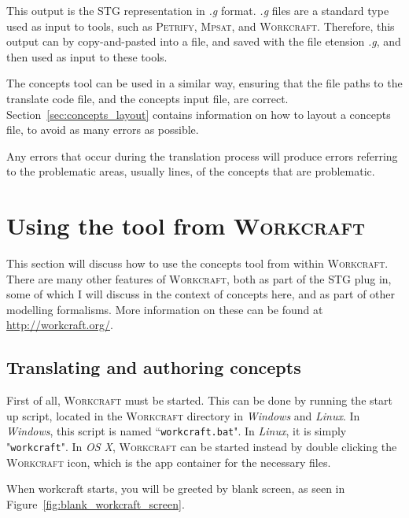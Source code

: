 \documentclass{proc}
\newcommand{\noun}[1]{\textsc{#1}}
\begin{document}
This output is the STG representation in \emph{.g} format. \emph{.g} files are a standard type used as input to tools, such as \noun{Petrify}, \noun{Mpsat}, and \noun{Workcraft}. 
Therefore, this output can by copy-and-pasted into a file, and saved with the file etension \emph{.g}, and then used as input to these tools. 

The concepts tool can be used in a similar way, ensuring that the file paths to the translate code file, and the concepts input file, are correct. Section~\ref{sec:concepts_layout} contains 
information on how to layout a concepts file, to avoid as many errors as possible. 

Any errors that occur during the translation process will produce errors referring to the problematic areas, usually lines, of the concepts that are problematic. 

\section{Using the tool from \noun{Workcraft} \label{sec:workcraft_usage}}

This section will discuss how to use the concepts tool from within \noun{Workcraft}. There are many other features of \noun{Workcraft}, both as part of the STG plug in, some of which I
 will discuss in the context of concepts here, and as part of other modelling formalisms. More information on these can be found at \url{http://workcraft.org/}.
 
 \subsection{Translating and authoring concepts}

First of all, \noun{Workcraft} must be started. This can be done by running the start up script, located in the \noun{Workcraft} directory in \emph{Windows} and \emph{Linux}. In 
\emph{Windows}, this script is named ``\texttt{workcraft.bat}". In \emph{Linux}, it is simply "\texttt{workcraft}". In \emph{OS X}, \noun{Workcraft} can be started instead by double 
clicking the \noun{Workcraft} icon, which is the app container for the necessary files. 

When workcraft starts, you will be greeted by blank screen, as seen in Figure~\ref{fig:blank_workcraft_screen}.
\end{document}

